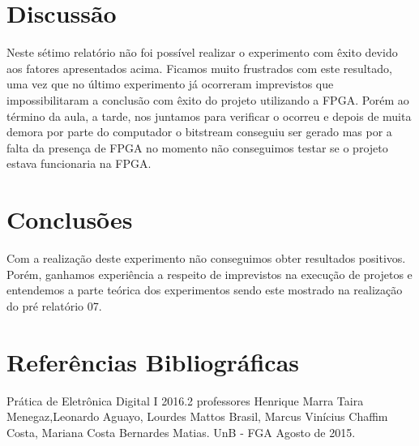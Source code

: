 \documentclass[12pts]{article}
\begin{document}
\section{Discussão}
\iffalse
Discussão sobre os resultados encontrados, comentando detalhadamente as medições realizadas e dando a devida interpretação destas, informando se os objetivos da experimento foram alcançados. Esta é uma das partes mais importantes do relatório: aqui, há oportunidade para expressar os conhecimentos adquiridos na prática e fazer a interrelação com os fundamentos teóricos.
\fi
      Neste sétimo relatório não foi possível realizar o experimento com êxito devido aos fatores apresentados acima. Ficamos muito frustrados com este resultado, uma vez que no último experimento já ocorreram imprevistos que impossibilitaram a conclusão com êxito do projeto utilizando a FPGA. Porém ao término da aula, a tarde, nos juntamos para verificar o ocorreu e depois de muita demora por parte do computador o bitstream conseguiu ser gerado mas por a falta da presença de FPGA no momento não conseguimos testar se o projeto estava funcionaria na FPGA. 

\section{Conclusões}
\iffalse
Conclusões, mostrando os êxitos e eventuais problemas encontrados na realização do experimento, indicando as limitações, apresentando recomendações e/ou sugestões.
\fi

Com a realização deste experimento não conseguimos obter resultados positivos. Porém, ganhamos experiência a respeito de imprevistos na execução de projetos e entendemos a parte teórica dos experimentos sendo este mostrado na realização do pré relatório 07. 

\section{Referências Bibliográficas}
\iffalse
Referencias Bibliográficas, relacionadas e citadas de acordo com as normas da ABNT.
\fi
Prática de Eletrônica Digital I 2016.2 professores Henrique Marra Taira Menegaz,Leonardo Aguayo, Lourdes Mattos Brasil, Marcus Vinícius Chaffim Costa, Mariana Costa Bernardes Matias. UnB - FGA Agosto de 2015.

\iffalse
\section{Diagramas Esquemáticos}
Diagramas Esquemáticos. Todos os diagramas devem ser inseridos ao final do relatório em páginas separadas do texto, indicando a identificação do circuito, autor, revisor, versão e datas relevantes.
\fi
\newpage
\end{document}
